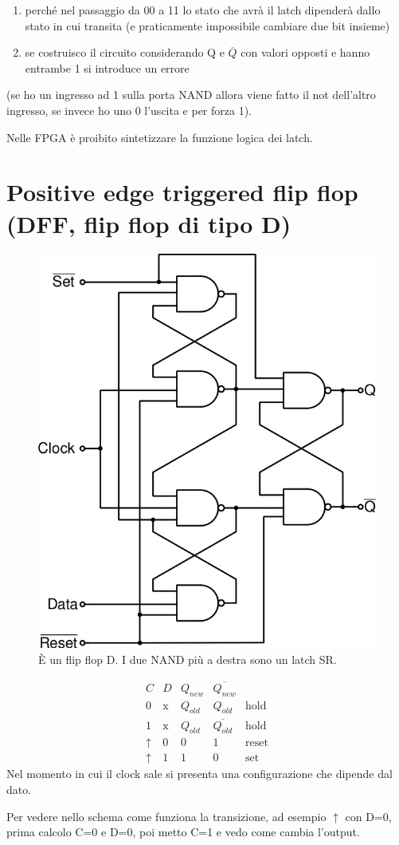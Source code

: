 \documentclass[
]{book}
\providecommand{\tightlist}{%
  \setlength{\itemsep}{0pt}\setlength{\parskip}{0pt}}
\begin{document}
\begin{enumerate}
\def\labelenumi{\arabic{enumi}.}
\tightlist
\item
  perché nel passaggio da 00 a 11 lo stato che avrà il latch dipenderà
  dallo stato in cui transita (e praticamente impossibile cambiare due
  bit insieme)
\item
  se costruisco il circuito considerando Q e \(\overline{Q}\) con valori
  opposti e hanno entrambe 1 si introduce un errore
\end{enumerate}

(se ho un ingresso ad 1 sulla porta NAND allora viene fatto il not
dell'altro ingresso, se invece ho uno 0 l'uscita e per forza 1).

Nelle FPGA è proibito sintetizzare la funzione logica dei latch.

\section{Positive edge triggered flip flop (DFF, flip flop di tipo
D)}\label{positive-edge-triggered-flip-flop-dff-flip-flop-di-tipo-d}

\begin{figure}
\centering
\includegraphics[width=0.3\linewidth,height=\textheight,keepaspectratio]{immagini/29.png}
\caption{È un flip flop D. I due NAND più a destra sono un latch SR.}
\end{figure}

\[
\begin{array}{ccccc}
C&D&Q_{new}&\overline{Q_{new}}\\
\hline0&\text{x}&Q_{old}&Q_{old}&\text{hold}\\
1&\text{x}&Q_{old}&\overline{Q_{old}}&\text{hold}\\
\uparrow&0&0&1&\text{reset}\\
\uparrow&1&1&0&\text{set}
\end{array}
\] Nel momento in cui il clock sale si presenta una configurazione che
dipende dal dato.

Per vedere nello schema come funziona la transizione, ad esempio
\(\uparrow\) con D=0, prima calcolo C=0 e D=0, poi metto C=1 e vedo come
cambia l'output.
\end{document}
